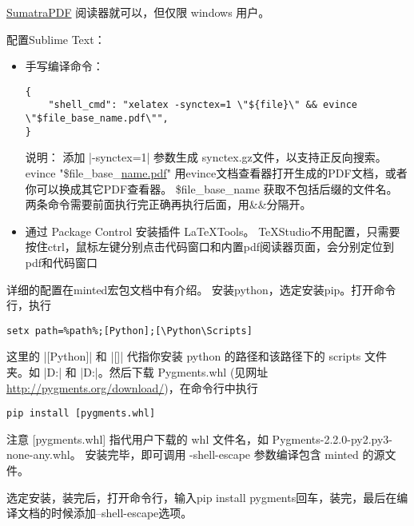 \href{https://www.sumatrapdfreader.org/free-pdf-reader.html}{SumatraPDF}
阅读器就可以，但仅限 windows 用户。



配置Sublime Text：
\begin{itemize}
  \item
    手写编译命令：
\begin{verbatim}
{
    "shell_cmd": "xelatex -synctex=1 \"${file}\" && evince \"$file_base_name.pdf\"",
}
\end{verbatim}
    说明： 添加 |-synctex=1| 参数生成
    synctex.gz文件，以支持正反向搜索。 evince
    "\$file\_base\_\href{http://name.pdf}{name.pdf}"
    用evince文档查看器打开生成的PDF文档，或者你可以换成其它PDF查看器。
    \$file\_base\_name 获取不包括后缀的文件名。
    两条命令需要前面执行完正确再执行后面，用\&\&分隔开。
  \item
    通过 Package Control 安装插件 LaTeXTools。
    TeXStudio不用配置，只需要按住ctrl，鼠标左键分别点击代码窗口和内置pdf阅读器页面，会分别定位到pdf和代码窗口
\end{itemize}



详细的配置在minted宏包文档中有介绍。
安装python，选定安装pip。打开命令行，执行

\begin{verbatim}
setx path=%path%;[Python];[\Python\Scripts]
\end{verbatim}

这里的 |[Python]| 和 |[\Python\Scripts]| 代指你安装 python
的路径和该路径下的 scripts 文件夹。如 |D:\Python{}| 和
|D:\Python{}\Scripts|。然后下载 Pygments.whl (见网址
\url{http://pygments.org/download/})，在命令行中执行

\begin{verbatim}
pip install [pygments.whl]
\end{verbatim}

注意 {[}pygments.whl{]} 指代用户下载的 whl 文件名，如
Pygments-2.2.0-py2.py3-none-any.whl。 安装完毕，即可调用 -shell-escape
参数编译包含 minted 的源文件。

选定安装，装完后，打开命令行，输入pip install
pygments回车，装完，最后在编译文档的时候添加--shell-escape选项。






